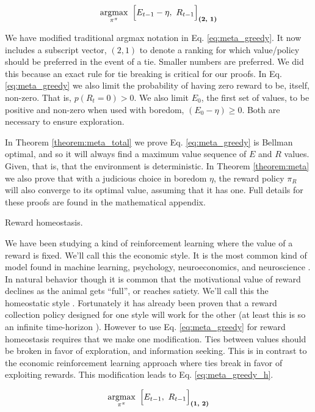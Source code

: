 \begin{equation}
\label{eq:meta_greedy} 
	\operatorname*{argmax}_{\pi^{\pi}} \ \Big [ E_{t-1} - \eta,\ R_{t-1} \Big ]_{\textbf{(2, 1)}}
\end{equation}
	
We have modified traditional argmax notation in Eq. \ref{eq:meta_greedy}. It now includes a subscript vector, $(2,1)$ to denote a ranking for which value/policy should be preferred in the event of a tie. Smaller numbers are preferred. We did this because an exact rule for tie breaking is critical for our proofs. In Eq. \ref{eq:meta_greedy} we also limit the probability of having zero reward to be, itself, non-zero. That is, $p(R_t=0) > 0$. We also limit $E_0$, the first set of values, to be positive and non-zero when used with boredom, $(E_0 - \eta) \geq 0$. Both are necessary to ensure exploration. 

In Theorem \ref{theorem:meta_total} we prove Eq. \ref{eq:meta_greedy} is Bellman optimal, and so it will always find a maximum value sequence of $E$ and $R$ values. Given, that is, that the environment is deterministic. In Theorem \ref{theorem:meta} we also prove that with a judicious choice in boredom $\eta$, the reward policy $\pi_R$ will also converge to its optimal value, assuming that it has one. Full details for these proofs are found in the mathematical appendix.


\begin{featurebox}
	\caption{Reward homeostasis.}
	\label{box:complexity}
	We have been studying a kind of reinforcement learning where the value of a reward is fixed. We'll call this the economic style. It is the most common kind of model found in machine learning, psychology, neuroeconomics, and neuroscience \citep{Sutton2018}. In natural behavior though it is common that the motivational value of reward declines as the animal gets ``full'', or reaches satiety. We'll call this the homeostatic style \citep{Keramati2014,Juechems2019,Munch2020}.
	Fortunately it has already been proven that a reward collection policy designed for one style will work for the other (at least this is so an infinite time-horizon \citep{Keramati2014}). However to use Eq. \ref{eq:meta_greedy} for reward homeostasis requires that we make one modification. Ties between values should be broken in favor of exploration, and information seeking. This is in contrast to the economic reinforcement learning approach where ties break in favor of exploiting rewards. This modification leads to Eq. \ref{eq:meta_greedy_h}.

	\begin{equation}
		\label{eq:meta_greedy_h} 
			\operatorname*{argmax}_{\pi^{\pi}} \ \Big [ E_{t-1},\ R_{t-1} \Big ]_{\textbf{(1, 2)}}
		\end{equation}
	\medskip
\end{featurebox}


